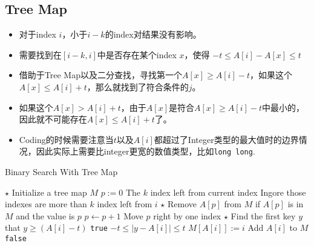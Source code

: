 \subsection{Tree Map}
\begin{CJK*}{UTF8}{gbsn}
\begin{itemize}
\item 对于index $i$，小于$i-k$的index对结果没有影响。
\item 需要找到在$[i-k, i]$中是否存在某个index $x$，使得 $-t\leq A[i] - A[x] \leq t$
\item 借助于Tree Map以及二分查找，寻找第一个$A[x]\geq A[i]-t$，如果这个$A[x]\leq A[i]+t$，那么就找到了符合条件的$j$。
\item 如果这个$A[x] > A[i]+t$，由于$A[x]$是符合$A[x]\geq A[i]-t$中最小的，因此就不可能存在$A[x]\leq A[i]+t$了。
\item Coding的时候需要注意当$t$以及$A[i]$都超过了Integer类型的最大值时的边界情况，因此实际上需要比integer更宽的数值类型，比如\texttt{long long}.
\end{itemize}
\end{CJK*}
\setcounter{algorithm}{0}
\begin{algorithm}[H]
\caption{Binary Search With Tree Map}
\begin{algorithmic}[1]
\State $\star$ Initialize a tree map $M$
\State $p:=0$ \Comment The $k$ index left from current index 
 \Comment Ingore those indexes are more than $k$ index left from $i$
\State $\star$ Remove $A[p]$ from $M$ if $A[p]$ is in $M$ and the value is $p$
\State $p\gets p+1$ \Comment Move $p$ right by one index
\EndIf
\State $\star$ Find the first key $y$ that $y\geq (A[i]-t)$
\State \Return \texttt{true} \Comment $-t\leq |y-A[i]| \leq t$
\EndIf
\State $M[A[i]]:=i$ \Comment Add $A[i]$ to $M$
\EndFor
\State \Return \texttt{false}
\EndProcedure
\end{algorithmic}
\end{algorithm}
\setcounter{lstlisting}{0}
